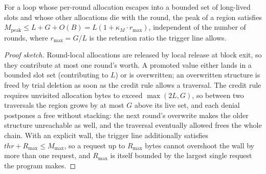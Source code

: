 \begin{theorem}
\label{thm:mem}
For a loop whose per-round allocation escapes into a bounded set of long-lived slots and whose other
allocations die with the round, the peak of a region satisfies
$M_{\text{peak}} \le L + G + O(B) = L(1 + \kappa_M \cdot r_{\max})$, independent of the number of
rounds, where $r_{\max} = G/L$ is the retention ratio the trigger line allows.
\end{theorem}
\begin{proof}[Proof sketch]
Round-local allocations are released by local release at block exit, so they contribute at most one
round's worth.
A promoted value either lands in a bounded slot set (contributing to $L$) or is overwritten; an
overwritten structure is freed by trial deletion as soon as the credit rule allows a traversal.
The credit rule requires unvisited allocation bytes to exceed $\max(2L, G)$, so between two
traversals the region grows by at most $G$ above its live set, and each denial postpones a free
without stacking: the next round's overwrite makes the older structure unreachable as well, and the
traversal eventually allowed frees the whole chain.
With an explicit wall, the trigger line additionally satisfies
$\mathit{thr} + R_{\max} \le M_{\max}$, so a request up to $R_{\max}$ bytes cannot overshoot the
wall by more than one request, and $R_{\max}$ is itself bounded by the largest single request the
program makes.
\end{proof}

